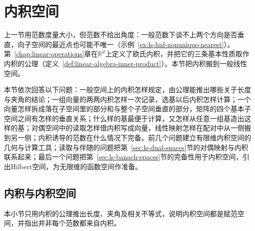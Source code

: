 
\section{内积空间}
\label{sec:ls-inner-product-spaces}

上一节用范数度量大小，但范数不给出角度：一般范数下谈不上两个方向是否垂直，向子空间的最近点也可能不唯一（示例~\ref{ex:ls-linf-nonunique-nearest}）。第~\ref{chap:linear-operations}章在$\mathbb R^d$上定义了欧氏内积，并把它的三条基本性质取作内积的公理（定义~\ref{def:linear-algebra-inner-product}）。本节把内积搬到一般线性空间。

本节依次回答以下问题：一般空间上的内积怎样规定，由公理能推出哪些关于长度与夹角的结论；一组向量的两两内积怎样一次记录，选基以后内积怎样计算；一个向量怎样拆成落在子空间里的部分和与整个子空间垂直的部分，矩阵的四个基本子空间之间有怎样的垂直关系；什么样的基最便于计算，又怎样从任意一组基造出这样的基；对偶空间中的读取怎样借内积写成向量，线性映射怎样在配对中从一侧搬到另一侧；内积诱导的范数在什么情况下完备。前几个问题建立有限维内积空间的几何与计算工具；读取与伴随的问题把第~\ref{sec:ls-dual-spaces}节的对偶映射与内积联系起来；最后一个问题把第~\ref{sec:ls-banach-spaces}节的完备性用于内积空间，引出Hilbert空间，为无限维的函数空间作准备。

\subsection{内积与内积空间}
\label{sec:ls-inner-product-definition}

本小节只用内积的公理推出长度、夹角及相关不等式，说明内积空间都是赋范空间，并指出并非每个范数都来自内积。

